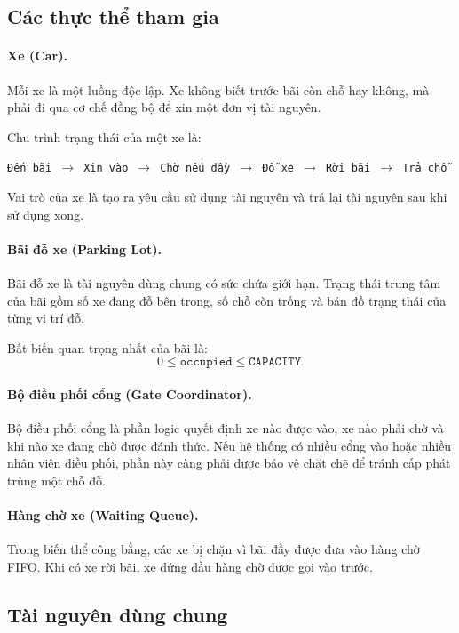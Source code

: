 \subsection{Các thực thể tham gia}

\paragraph{Xe (Car).}
Mỗi xe là một luồng độc lập. Xe không biết trước bãi còn chỗ hay không, mà
phải đi qua cơ chế đồng bộ để xin một đơn vị tài nguyên.

Chu trình trạng thái của một xe là:

\begin{center}
\texttt{Đến bãi $\rightarrow$ Xin vào $\rightarrow$ Chờ nếu đầy
$\rightarrow$ Đỗ xe $\rightarrow$ Rời bãi $\rightarrow$ Trả chỗ}
\end{center}

Vai trò của xe là tạo ra yêu cầu sử dụng tài nguyên và trả lại tài nguyên
sau khi sử dụng xong.

\paragraph{Bãi đỗ xe (Parking Lot).}
Bãi đỗ xe là tài nguyên dùng chung có sức chứa giới hạn. Trạng thái trung
tâm của bãi gồm số xe đang đỗ bên trong, số chỗ còn trống và bản đồ trạng
thái của từng vị trí đỗ.

Bất biến quan trọng nhất của bãi là:
\[
    0 \leq \texttt{occupied} \leq \texttt{CAPACITY}.
\]

\paragraph{Bộ điều phối cổng (Gate Coordinator).}
Bộ điều phối cổng là phần logic quyết định xe nào được vào, xe nào phải
chờ và khi nào xe đang chờ được đánh thức. Nếu hệ thống có nhiều cổng vào
hoặc nhiều nhân viên điều phối, phần này càng phải được bảo vệ chặt chẽ
để tránh cấp phát trùng một chỗ đỗ.

\paragraph{Hàng chờ xe (Waiting Queue).}
Trong biến thể công bằng, các xe bị chặn vì bãi đầy được đưa vào hàng chờ
FIFO. Khi có xe rời bãi, xe đứng đầu hàng chờ được gọi vào trước.

\subsection{Tài nguyên dùng chung}

